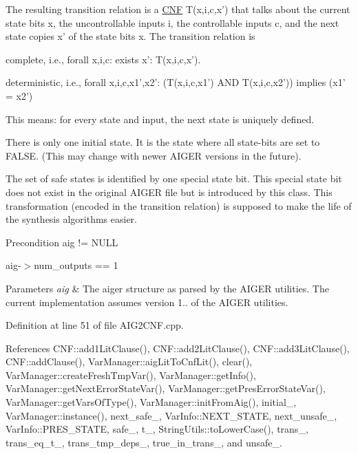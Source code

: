 The resulting transition relation is a \hyperlink{classCNF}{C\-N\-F} T(x,i,c,x') that talks about the current state bits x, the uncontrollable inputs i, the controllable inputs c, and the next state copies x' of the state bits x. The transition relation is 
\begin{DoxyItemize}
\item complete, i.\-e., forall x,i,c\-: exists x'\-: T(x,i,c,x'). 
\item deterministic, i.\-e., forall x,i,c,x1',x2'\-: (T(x,i,c,x1') A\-N\-D T(x,i,c,x2')) implies (x1' = x2') 
\end{DoxyItemize}This means\-: for every state and input, the next state is uniquely defined.

There is only one initial state. It is the state where all state-\/bits are set to F\-A\-L\-S\-E. (This may change with newer A\-I\-G\-E\-R versions in the future).

The set of safe states is identified by one special state bit. This special state bit does not exist in the original A\-I\-G\-E\-R file but is introduced by this class. This transformation (encoded in the transition relation) is supposed to make the life of the synthesis algorithms easier.

\begin{DoxyPrecond}{Precondition}
aig != N\-U\-L\-L 

aig-\/$>$num\-\_\-outputs == 1 
\end{DoxyPrecond}

\begin{DoxyParams}{Parameters}
{\em aig} & The aiger structure as parsed by the A\-I\-G\-E\-R utilities. The current implementation assumes version 1.. of the A\-I\-G\-E\-R utilities. \\
\hline
\end{DoxyParams}


Definition at line 51 of file A\-I\-G2\-C\-N\-F.\-cpp.



References C\-N\-F\-::add1\-Lit\-Clause(), C\-N\-F\-::add2\-Lit\-Clause(), C\-N\-F\-::add3\-Lit\-Clause(), C\-N\-F\-::add\-Clause(), Var\-Manager\-::aig\-Lit\-To\-Cnf\-Lit(), clear(), Var\-Manager\-::create\-Fresh\-Tmp\-Var(), Var\-Manager\-::get\-Info(), Var\-Manager\-::get\-Next\-Error\-State\-Var(), Var\-Manager\-::get\-Pres\-Error\-State\-Var(), Var\-Manager\-::get\-Vars\-Of\-Type(), Var\-Manager\-::init\-From\-Aig(), initial\-\_\-, Var\-Manager\-::instance(), next\-\_\-safe\-\_\-, Var\-Info\-::\-N\-E\-X\-T\-\_\-\-S\-T\-A\-T\-E, next\-\_\-unsafe\-\_\-, Var\-Info\-::\-P\-R\-E\-S\-\_\-\-S\-T\-A\-T\-E, safe\-\_\-, t\-\_\-, String\-Utils\-::to\-Lower\-Case(), trans\-\_\-, trans\-\_\-eq\-\_\-t\-\_\-, trans\-\_\-tmp\-\_\-deps\-\_\-, true\-\_\-in\-\_\-trans\-\_\-, and unsafe\-\_\-.



